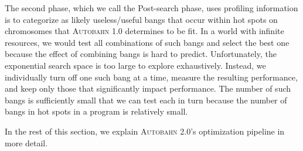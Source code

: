 \documentclass[format=sigplan, review=true]{acmart}
\newcommand{\hotspots}[0]{hot spots}
\newcommand{\useful}[0]{useful}
\newcommand{\useless}[0]{useless}
\newcommand{\Ao}[0]{\textsc{Autobahn 1.0}}
\newcommand{\At}[0]{\textsc{Autobahn 2.0}}
\newcommand{\Postopt}[0]{Post-search}
\begin{document}
The second phase, which we call the \Postopt{} phase, uses profiling
information is to categorize as likely \useless{}/\useful{} bangs that occur within \hotspots{} on
chromosomes that \Ao{} determines to be fit.  In a world with infinite resources,
we would test all combinations of such bangs and select the best one
because the effect of combining bangs is hard to predict.
Unfortunately, the exponential search space is too large to explore
exhaustively. Instead, we individually turn off one such bang at a
time, measure the resulting performance, and keep only those that
significantly impact performance.  The number of such bangs is
sufficiently small that we can test each in turn because the number of
bangs in \hotspots{} in a program is relatively small.

In the rest of this section, we explain \At{}'s optimization pipeline
in more detail.
\end{document}
